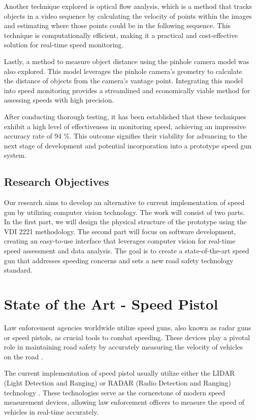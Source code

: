 Another technique explored is optical flow analysis, which is a method that tracks objects in a video sequence by calculating the velocity of points within the images and estimating where those points could be in the following sequence. This technique is computationally efficient, making it a practical and cost-effective solution for real-time speed monitoring.

Lastly, a method to measure object distance using the pinhole camera model was also explored. This model leverages the pinhole camera's geometry to calculate the distance of objects from the camera's vantage point. Integrating this model into speed monitoring provides a streamlined and economically viable method for assessing speeds with high precision.

After conducting thorough testing, it has been established that these techniques exhibit a high level of effectiveness in monitoring speed, achieving an impressive accuracy rate of 94 \%. This outcome signifies their viability for advancing to the next stage of development and potential incorporation into a prototype speed gun system.

\section{Research Objectives}
Our research aims to develop an alternative to current implementation of speed gun by utilizing computer vision technology. The work will consist of two parts. In the first part, we will design the physical structure of the prototype using the VDI 2221 methodology. The second part will focus on software development, creating an easy-to-use interface that leverages computer vision for real-time speed assessment and data analysis. The goal is to create a state-of-the-art speed gun that addresses speeding concerns and sets a new road safety technology standard.

\chapter{State of the Art - Speed Pistol}
\label{chap:stateoftheart}
Law enforcement agencies worldwide utilize speed guns, also known as radar guns or speed pistols, as crucial tools to combat speeding. These devices play a pivotal role in maintaining road safety by accurately measuring the velocity of vehicles on the road \cite{Hull_2020}.

The current implementation of speed pistol usually utilize either the LIDAR (Light Detection and Ranging) or RADAR (Radio Detection and Ranging) technology \cite{StalkerRadar_2023} \cite{FlyGuys_2023} \cite{Kustom23} \cite{LaserTech_2023}. These technologies serve as the cornerstone of modern speed measurement devices, allowing law enforcement officers to measure the speed of vehicles in real-time accurately.

